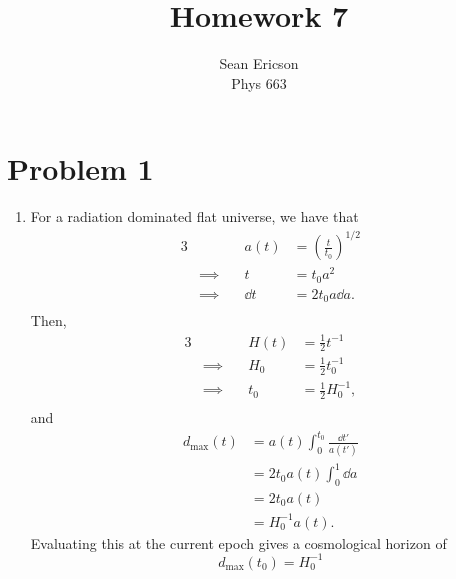 \documentclass[12pt]{article}
\begin{document}
\title{Homework 7}
\author{Sean Ericson \\ Phys 663}
\maketitle

\section*{Problem 1}
\begin{enumerate}[label=\roman*)]
    \item For a radiation dominated flat universe, we have that
    \begin{alignat*}{3}
        & \quad & a(t) &= \left(\frac{t}{t_0}\right)^{1/2}  \\
        &\implies\quad & t &= t_0 a^2 \\
        &\implies\quad & \dd t &= 2t_0 a\dd a. \\
    \end{alignat*}
    Then,
    \begin{alignat*}{3}
        & \quad & H(t) &= \frac{1}{2}t^{-1}  \\
        &\implies\quad & H_0 &= \frac{1}{2}t_0^{-1} \\
        &\implies\quad & t_0 &= \frac{1}{2}H_0^{-1}, \\
    \end{alignat*}
    and
    \begin{align*}
        d_\text{max}(t) &= a(t)\int_{0}^{t_0} \frac{\dd t'}{a(t')} \\
        &= 2t_0a(t)\int_0^1\dd a \\
        &= 2t_0a(t) \\
        &= H_0^{-1}a(t).
    \end{align*}
    Evaluating this at the current epoch gives a cosmological horizon of 
    \[ \boxed{d_\text{max}(t_0) = H_0^{-1}} \]


\end{enumerate}
\end{document}
